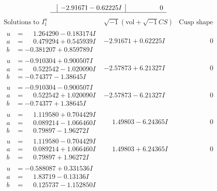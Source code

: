 \documentclass[1p]{elsarticle_modified}
\theoremstyle{definition}
\newcommand{\I}{\sqrt{-1}}
\begin{document}
$$\begin{array}{c|c|c}
 & -2.91671 - 0.62225 I & \phantom{-0.000000 } 0\\
 \hline 
 \end{array}$$\newpage$$\begin{array}{c|c|c}  
\text{Solutions to }I^u_{1}& \I (\text{vol} + \sqrt{-1}CS) & \text{Cusp shape}\\
 \hline 
\begin{aligned}
u &= \phantom{-}1.264290 - 0.183174 I \\
a &= \phantom{-}0.479294 + 0.545939 I \\
b &= -0.381207 + 0.859789 I\end{aligned}
 & -2.91671 + 0.62225 I & \phantom{-0.000000 } 0 \\ \hline\begin{aligned}
u &= -0.910304 + 0.900507 I \\
a &= \phantom{-}0.522542 - 1.020090 I \\
b &= -0.74377 - 1.38645 I\end{aligned}
 & -2.57873 + 6.21327 I & \phantom{-0.000000 } 0 \\ \hline\begin{aligned}
u &= -0.910304 - 0.900507 I \\
a &= \phantom{-}0.522542 + 1.020090 I \\
b &= -0.74377 + 1.38645 I\end{aligned}
 & -2.57873 - 6.21327 I & \phantom{-0.000000 } 0 \\ \hline\begin{aligned}
u &= \phantom{-}1.119580 + 0.704429 I \\
a &= \phantom{-}0.089214 - 1.066460 I \\
b &= \phantom{-}0.79897 - 1.96272 I\end{aligned}
 & \phantom{-}1.49803 - 6.24365 I & \phantom{-0.000000 } 0 \\ \hline\begin{aligned}
u &= \phantom{-}1.119580 - 0.704429 I \\
a &= \phantom{-}0.089214 + 1.066460 I \\
b &= \phantom{-}0.79897 + 1.96272 I\end{aligned}
 & \phantom{-}1.49803 + 6.24365 I & \phantom{-0.000000 } 0 \\ \hline\begin{aligned}
u &= -0.588087 + 0.331536 I \\
a &= \phantom{-}1.83719 - 0.13136 I \\
b &= \phantom{-}0.125737 - 1.152850 I\end{aligned}

\end{array}$$
\end{document}
